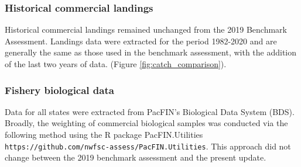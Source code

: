 \documentclass[11pt,
  english,
  a4paper,
]{article}
\begin{document}
\leavevmode\tagmcend\tagstructend


\hypertarget{historical-commercial-landings}{%
\subsubsection{Historical commercial landings}\label{historical-commercial-landings}}

\leavevmode\tagmcend\tagstructend


Historical commercial landings remained unchanged from the 2019 Benchmark Assessment. Landings data were extracted for the period 1982-2020 and are generally the same as those used in the benchmark assessment, with the addition of the last two years of data. (Figure \ref{fig:catch_comparison}).

\leavevmode\tagmcend\tagstructend\par


\hypertarget{fishery-biological-data}{%
\subsubsection{Fishery biological data}\label{fishery-biological-data}}

\leavevmode\tagmcend\tagstructend

Data for all states were extracted from PacFIN's Biological Data System (BDS). Broadly, the weighting of commercial biological samples was conducted via the following method using the R package PacFIN.Utilities \texttt{https://github.com/nwfsc-assess/PacFIN.Utilities}. This approach did not change between the 2019 benchmark assessment and the present update.
\end{document}

